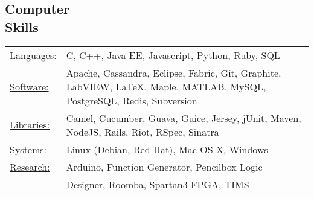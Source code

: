 \documentclass[margin]{res}
\begin{document}
\begin{resume}
\section{Computer \\ Skills}
   \begin{tabular}{l p{3in}}
    \underline{Languages:} & C, C++, Java EE, Javascript, Python, Ruby, SQL \\
     \underline{Software:} & Apache, Cassandra,
Eclipse,
Fabric, 
Git,
Graphite, 
LabVIEW,
\LaTeX, Maple,
     MATLAB, MySQL, PostgreSQL, Redis, Subversion \\
     \underline{Libraries:} & Camel, Cucumber, Guava, Guice, Jersey, jUnit, Maven, NodeJS, Rails, Riot, RSpec, Sinatra \\
     \underline{Systems:} & Linux (Debian, Red Hat), Mac OS X, Windows \\
     \underline{Research:} & Arduino, Function Generator, Pencilbox Logic \\ & Designer, Roomba, Spartan3 FPGA, TIMS
\end{tabular}


\end{resume}
\end{document}
